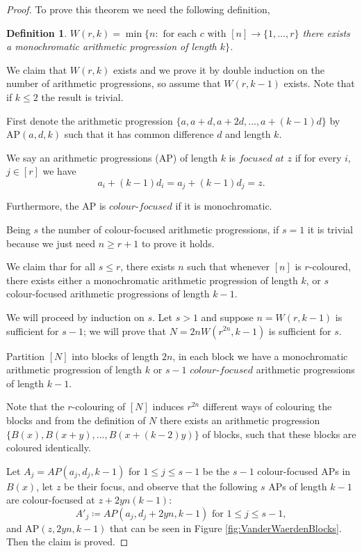 \documentclass[12pt,twoside,a4paper,bibliography=totocnumbered]{book}
\numberwithin{equation}{section}
\newtheorem{definition}	[theorem] {Definition}
\theoremstyle{remark}
\begin{document}
\begin{proof}To prove this theorem we need the following definition,

\begin{definition}
$W(r,k) = \min \{n \colon \text{ for each } c \text{ with } [n] \rightarrow \{1,\ldots,r\}$ there exists a monochromatic arithmetic  progression of length $k \}$.
\end{definition}
We claim that $W(r,k)$ exists and we prove it by double induction on the number of arithmetic progressions, so assume that $W(r, k-1)$ exists. Note that if $k \leq 2$ the result is trivial.

First denote the arithmetic progression $\{a, a + d, a +2d, \ldots, a+(k-1)d\}$ by AP$(a,d,k)$ such that it has common difference  $d$ and length $k$.

We say an arithmetic progressions (AP) of length $k$ is $\textit{focused at}$ $z$ if for every $i$, $j \in [r]$ we have
 $$ a_i +  (k-1)d_i = a_j  + (k-1) d_j = z .$$

Furthermore, the AP is $\textit{colour-focused}$ if it is monochromatic.

Being $s$ the number of colour-focused arithmetic progressions, if $s=1$ it is trivial because we just need $n \geq r+1$ to prove it holds.

We claim thar for all $s \leq r$, there exists $n$ such that whenever $[n]$ is $r$-coloured, there exists either a monochromatic arithmetic progression of length $k$, or $s$ colour-focused arithmetic progressions of length $k-1$.

We will proceed by induction on $s$. Let $s > 1$ and suppose $n=W(r,k-1)$ is sufficient for $s-1$; we will prove that $N=2n W(r^{2n},k-1)$ is sufficient for $s$.

Partition $[N]$ into blocks of length $2n$, in each block we have a monochromatic arithmetic progression of length $k$ or $s-1$ $\textit{colour-focused}$ arithmetic progressions of length $k-1$. 

Note that the $r$-colouring of $[N]$ induces $r^{2n}$ different ways of colouring the blocks and from the definition of $N$ there exists an arithmetic progression $\{B(x), B(x+y), \ldots , B(x+(k-2)y)\}$ of blocks, such that these blocks are coloured identically.

Let $A_j = AP(a_j, d_j, k-1)$ for $1 \leq j \leq s-1$ be the $s-1$ colour-focused APs in $B(x)$, let $z$ be their focus, and observe that the following $s$ APs of length $k-1$ are colour-focused at $z+ 2yn(k-1) \colon$
$$ A'_j \coloneqq AP(a_j, d_j + 2yn, k-1) \text{ for }1 \leq j \leq s-1,$$ 
and AP$(z, 2yn, k-1)$ that can be seen in Figure \ref{fig:VanderWaerdenBlocks}. Then the claim is proved.


\end{proof}
\end{document}
